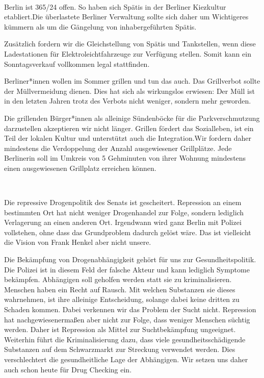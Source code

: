 \documentclass[a4paper,10pt]{article}
\newcommand{\mysection}[1]{{\vspace{1cm}\noindent\color{gray}{\ttfamily\LARGE\raggedright #1}\\\medskip}}
\newcommand{\abschnitt}[2]{%
\mysection{\raggedright #1}%
\begin{figure}[t]%
\vspace*{-2.7cm}%
\hspace*{-2.1cm}%
\texttt{[image: images/blog/large/\#2]} %
\end{figure}%
}
\newcommand{\querschlaeger}[1]{
\begin{figure}[t]%
\vspace*{-2.7cm}%
\hspace*{-2.1cm}%
\texttt{[image: images/blog/large/\#1]} %
\end{figure}%
}
\begin{document}
\mysection{Kiezleben}

Berlin ist 365/24 offen. So haben sich Spätis in der Berliner Kiezkultur
etabliert.Die überlastete Berliner Verwaltung sollte sich daher um
Wichtigeres kümmern als um die Gängelung von inhabergeführten Spätis.

Zusätzlich fordern wir die Gleichstellung von Spätis und Tankstellen,
wenn diese Ladestationen für Elektroleichtfahrzeuge zur Verfügung
stellen. Somit kann ein Sonntagsverkauf vollkommen legal stattfinden.

Berliner*innen wollen im Sommer grillen und tun das auch. Das
Grillverbot sollte der Müllvermeidung dienen. Dies hat sich als
wirkungslos erwiesen: Der Müll ist in den letzten Jahren trotz des
Verbots nicht weniger, sondern mehr geworden.

Die grillenden Bürger*innen als alleinige Sündenböcke für die
Parkverschmutzung darzustellen akzeptieren wir nicht länger. Grillen
fördert das Sozialleben, ist ein Teil der lokalen Kultur und unterstützt
auch die Integration.Wir fordern daher mindestens die Verdoppelung der
Anzahl ausgewiesener Grillplätze. Jede Berlinerin soll im Umkreis von 5
Gehminuten von ihrer Wohnung mindestens einen ausgewiesenen Grillplatz
erreichen können.

\mysection{Sucht-{\raisebox{-.5cm}{~}} und Drogenpolitik}

Die repressive Drogenpolitik des Senats ist gescheitert. Repression an
einem bestimmten Ort hat nicht weniger Drogenhandel zur Folge, sondern
lediglich Verlagerung an einen anderen Ort. Irgendwann wird ganz Berlin
mit Polizei vollstehen, ohne dass das Grundproblem dadurch gelöst wäre.
Das ist vielleicht die Vision von Frank Henkel aber nicht unsere.

Die Bekämpfung von Drogenabhängigkeit gehört für uns zur
Gesundheitspolitik. Die Polizei ist in diesem Feld der falsche Akteur
und kann lediglich Symptome bekämpfen. Abhängigen soll geholfen werden
statt sie zu kriminalisieren. Menschen haben ein Recht auf Rausch. Mit
welchen Substanzen sie dieses wahrnehmen, ist ihre alleinige
Entscheidung, solange dabei keine dritten zu Schaden kommen. Dabei
verkennen wir das Problem der Sucht nicht. Repression hat
nachgewiesenermaßen aber nicht zur Folge, dass weniger Menschen süchtig
werden. Daher ist Repression als Mittel zur Suchtbekämpfung ungeeignet.
Weiterhin führt die Kriminalisierung dazu, dass viele
gesundheitsschädigende Substanzen auf dem Schwarzmarkt zur Streckung
verwendet werden. Dies verschlechtert die gesundheitliche Lage der
Abhängigen. Wir setzen uns daher auch schon heute für Drug Checking ein.
\end{document}

